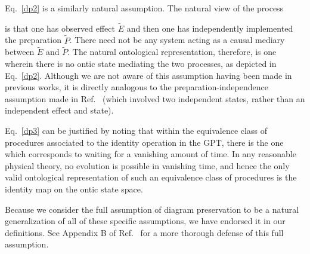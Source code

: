 \documentclass[onecolum,aps,groupedaddress,nofootinbib]{revtex4-2}
\begin{document}
Eq.~\eqref{dp2} is a similarly natural assumption.
The natural view of the process
\beq
{}
\eeq
is that one has observed effect $\widetilde{E}$ and then one has independently implemented the preparation $\widetilde{P}$. There need not be any system acting as a causal mediary between $\widetilde{E}$ and $\widetilde{P}$.
  The natural ontological representation, therefore,
is one wherein
there is no ontic state mediating the two processes,
as depicted in Eq.~\eqref{dp2}.  Although we are not aware of this assumption having been made in previous works, it is directly analogous to the
preparation-independence assumption made in Ref.~\cite{Pusey2012} (which involved two independent states, rather than an independent effect and state).

Eq.~\eqref{dp3} can be justified by noting that within the equivalence class of procedures associated to the identity operation in the GPT, there is the one which corresponds to waiting for a vanishing amount of time.
In any reasonable physical theory, no evolution is possible in vanishing time, and hence the only valid ontological representation of such an equivalence class of procedures is the identity map on the ontic state space.

Because we consider the full assumption of diagram preservation to be a natural generalization of all of these specific assumptions, we have endorsed it in our definitions.
 See Appendix B of Ref.~\cite{schmid2020unscrambling} for a more thorough defense of this full assumption.
\end{document}
